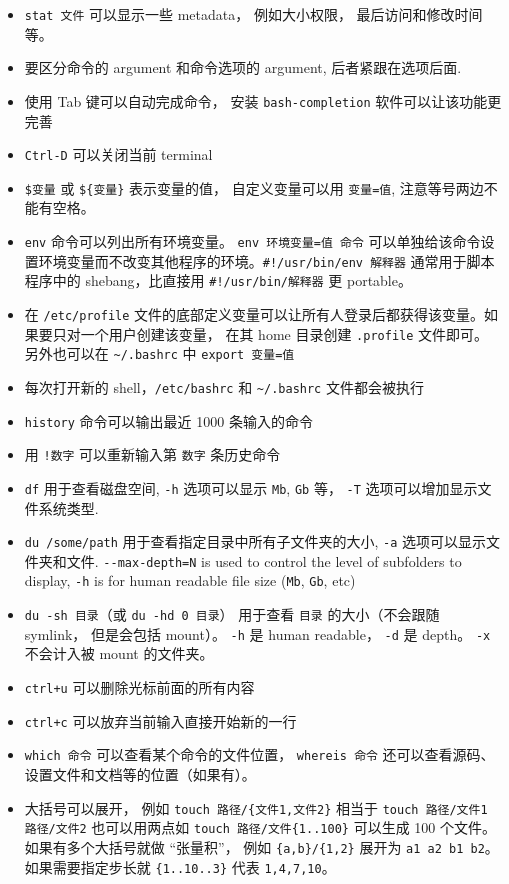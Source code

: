 \begin{itemize}
\item \verb`stat 文件` 可以显示一些 metadata， 例如大小权限， 最后访问和修改时间等。
\item 要区分命令的 argument 和命令选项的 argument, 后者紧跟在选项后面.
\item 使用 Tab 键可以自动完成命令， 安装 \verb`bash-completion` 软件可以让该功能更完善
\item \verb`Ctrl-D` 可以关闭当前 terminal
\item \verb`$变量` 或 \verb`${变量}` 表示变量的值， 自定义变量可以用 \verb`变量=值`, 注意等号两边不能有空格。
\item \verb`env` 命令可以列出所有环境变量。 \verb`env 环境变量=值 命令` 可以单独给该命令设置环境变量而不改变其他程序的环境。\verb`#!/usr/bin/env 解释器` 通常用于脚本程序中的 shebang，比直接用 \verb`#!/usr/bin/解释器` 更 portable。
\item 在 \verb`/etc/profile` 文件的底部定义变量可以让所有人登录后都获得该变量。如果要只对一个用户创建该变量， 在其 home 目录创建 \verb`.profile` 文件即可。 另外也可以在 \verb`~/.bashrc` 中 \verb`export 变量=值`
\item 每次打开新的 shell，\verb`/etc/bashrc` 和 \verb`~/.bashrc` 文件都会被执行
\item \verb`history` 命令可以输出最近 1000 条输入的命令
\item 用 \verb`!数字` 可以重新输入第 \verb`数字` 条历史命令
\item \verb`df` 用于查看磁盘空间, \verb`-h` 选项可以显示 \verb`Mb`, \verb`Gb` 等， \verb`-T` 选项可以增加显示文件系统类型.
\item \verb`du /some/path` 用于查看指定目录中所有子文件夹的大小, \verb`-a` 选项可以显示文件夹和文件. \verb`--max-depth=N` is used to control the level of subfolders to display, \verb`-h` is for human readable file size (\verb`Mb`, \verb`Gb`, etc)
\item \verb`du -sh 目录`（或 \verb`du -hd 0 目录`） 用于查看 \verb`目录` 的大小（不会跟随 symlink， 但是会包括 mount）。 \verb`-h` 是 human readable， \verb`-d` 是 depth。 \verb`-x` 不会计入被 mount 的文件夹。
\item \verb`ctrl+u` 可以删除光标前面的所有内容
\item \verb`ctrl+c` 可以放弃当前输入直接开始新的一行
\item \verb`which 命令` 可以查看某个命令的文件位置， \verb`whereis 命令` 还可以查看源码、设置文件和文档等的位置（如果有）。
\item 大括号可以展开， 例如 \verb`touch 路径/{文件1,文件2}` 相当于 \verb`touch 路径/文件1 路径/文件2` 也可以用两点如 \verb`touch 路径/文件{1..100}` 可以生成 100 个文件。 如果有多个大括号就做 “张量积”， 例如 \verb`{a,b}/{1,2}` 展开为 \verb`a1 a2 b1 b2`。 如果需要指定步长就 \verb`{1..10..3}` 代表 \verb`1,4,7,10`。
\end{itemize}

